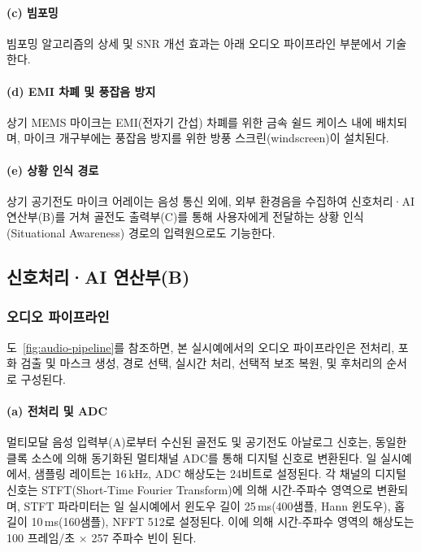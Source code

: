 \documentclass{article}
\begin{document}
\paragraph{(c) 빔포밍}

빔포밍 알고리즘의 상세 및 SNR 개선 효과는 아래 오디오 파이프라인 부분에서 기술한다.

\paragraph{(d) EMI 차폐 및 풍잡음 방지}

상기 MEMS 마이크는 EMI(전자기 간섭) 차폐를 위한 금속 쉴드 케이스 내에 배치되며, 마이크 개구부에는 풍잡음 방지를 위한 방풍 스크린(windscreen)이 설치된다.

\paragraph{(e) 상황 인식 경로}

상기 공기전도 마이크 어레이는 음성 통신 외에, 외부 환경음을 수집하여 신호처리·AI 연산부(B)를 거쳐 골전도 출력부(C)를 통해 사용자에게 전달하는 상황 인식(Situational Awareness) 경로의 입력원으로도 기능한다.

\subsection{신호처리·AI 연산부(B)}

\subsubsection{오디오 파이프라인}

도~\ref{fig:audio-pipeline}를 참조하면, 본 실시예에서의 오디오 파이프라인은 전처리, 포화 검출 및 마스크 생성, 경로 선택, 실시간 처리, 선택적 보조 복원, 및 후처리의 순서로 구성된다.

\paragraph{(a) 전처리 및 ADC}

멀티모달 음성 입력부(A)로부터 수신된 골전도 및 공기전도 아날로그 신호는, 동일한 클록 소스에 의해 동기화된 멀티채널 ADC를 통해 디지털 신호로 변환된다. 일 실시예에서, 샘플링 레이트는 16\,kHz, ADC 해상도는 24비트로 설정된다. 각 채널의 디지털 신호는 STFT(Short-Time Fourier Transform)에 의해 시간-주파수 영역으로 변환되며, STFT 파라미터는 일 실시예에서 윈도우 길이 25\,ms(400샘플, Hann 윈도우), 홉 길이 10\,ms(160샘플), NFFT 512로 설정된다. 이에 의해 시간-주파수 영역의 해상도는 100 프레임/초 $\times$ 257 주파수 빈이 된다.
\end{document}
